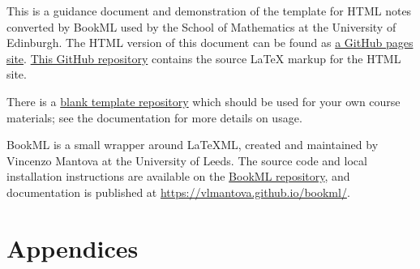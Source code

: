 \documentclass[12pt,oneside]{book}
\begin{document}


\maketitle

This is a guidance document and demonstration of the template for HTML notes converted by BookML used by the School of Mathematics at the University of Edinburgh. The HTML version of this document can be found as \href{https://uoe-school-of-mathematics.github.io/Workflow-Documentation/index.html}{a GitHub pages site}. \href{https://github.com/UoE-School-of-Mathematics/Workflow-Documentation}{This GitHub repository} contains the source LaTeX markup for the HTML site.

There is a \href{https://github.com/UoE-School-of-Mathematics/Workflow-Template-Blank}{blank template repository} which should be used for your own course materials; see the documentation for more details on usage.

BookML is a small wrapper around LaTeXML, created and maintained by Vincenzo Mantova at the University of Leeds. The source code and local installation instructions are available on the \href{https://github.com/vlmantova/bookml}{BookML repository}, and documentation is published at \url{https://vlmantova.github.io/bookml/}.


\tableofcontents





% 

\mainmatter




\chapter{Appendices}






\appendix



\backmatter


\end{document}
